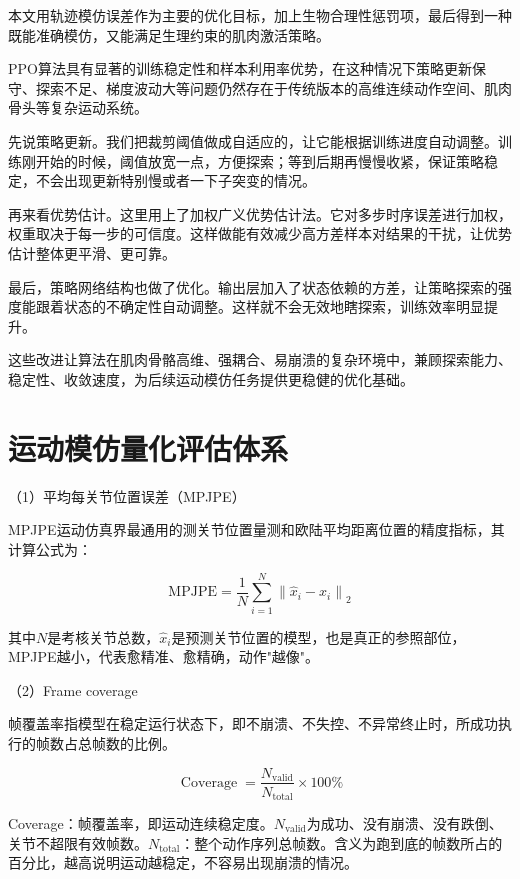 本文用轨迹模仿误差作为主要的优化目标，加上生物合理性惩罚项，最后得到一种既能准确模仿，又能满足生理约束的肌肉激活策略。

PPO算法具有显著的训练稳定性和样本利用率优势，在这种情况下策略更新保守、探索不足、梯度波动大等问题仍然存在于传统版本的高维连续动作空间、肌肉骨头等复杂运动系统。

先说策略更新。我们把裁剪阈值做成自适应的，让它能根据训练进度自动调整。训练刚开始的时候，阈值放宽一点，方便探索；等到后期再慢慢收紧，保证策略稳定，不会出现更新特别慢或者一下子突变的情况。

再来看优势估计。这里用上了加权广义优势估计法。它对多步时序误差进行加权，权重取决于每一步的可信度。这样做能有效减少高方差样本对结果的干扰，让优势估计整体更平滑、更可靠。

最后，策略网络结构也做了优化。输出层加入了状态依赖的方差，让策略探索的强度能跟着状态的不确定性自动调整。这样就不会无效地瞎探索，训练效率明显提升。

这些改进让算法在肌肉骨骼高维、强耦合、易崩溃的复杂环境中，兼顾探索能力、稳定性、收敛速度，为后续运动模仿任务提供更稳健的优化基础。

\section{运动模仿量化评估体系}\label{ux8fd0ux52a8ux6a21ux4effux91cfux5316ux8bc4ux4f30ux4f53ux7cfb}

（1）平均每关节位置误差（MPJPE）

MPJPE运动仿真界最通用的测关节位置量测和欧陆平均距离位置的精度指标，其计算公式为：

\begin{equation}
\mathrm{MPJPE}=\frac{1}{N}\sum_{i=1}^{N}\left\|\widehat{x}_{i}-x_{i}\right\|_{2}
\tag{2-1}
\end{equation}

其中$N$是考核关节总数，\({\widehat{x}}_{i}\)是预测关节位置的模型，也是真正的参照部位，MPJPE越小，代表愈精准、愈精确，动作"越像"。

（2）Frame coverage

帧覆盖率指模型在稳定运行状态下，即不崩溃、不失控、不异常终止时，所成功执行的帧数占总帧数的比例。

\begin{equation}
\operatorname{Coverage}=\frac{N_{\mathrm{valid}}}{N_{\mathrm{total}}} \times 100\%
\tag{2-2}
\end{equation}

Coverage：帧覆盖率，即运动连续稳定度。\(N_{\mathrm{valid}}\)为成功、没有崩溃、没有跌倒、关节不超限有效帧数。\(N_{\mathrm{total}}\)：整个动作序列总帧数。含义为跑到底的帧数所占的百分比，越高说明运动越稳定，不容易出现崩溃的情况。

